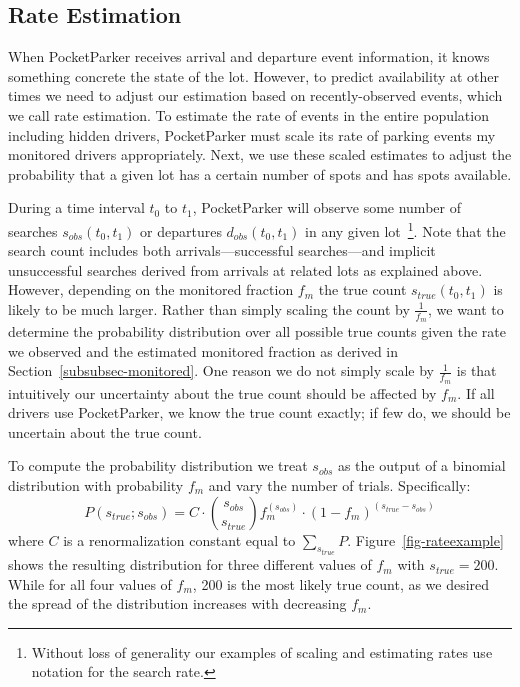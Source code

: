 \subsection{Rate Estimation}
\label{subsec-rates}

When PocketParker receives arrival and departure event information, it knows
something concrete the state of the lot. However, to predict availability at
other times we need to adjust our estimation based on recently-observed
events, which we call rate estimation. To estimate the rate of events in the
entire population including hidden drivers, PocketParker must scale its rate
of parking events my monitored drivers appropriately. Next, we use these
scaled estimates to adjust the probability that a given lot has a certain
number of spots and has spots available.

During a time interval $t_0$ to $t_1$, PocketParker will observe some number
of searches $s_{obs}(t_0, t_1)$ or departures $d_{obs}(t_0, t_1)$ in any
given lot~\footnote{Without loss of generality our examples of scaling and
estimating rates use notation for the search rate.}. Note that the search
count includes both arrivals---successful searches---and implicit
unsuccessful searches derived from arrivals at related lots as explained
above. However, depending on the monitored fraction $f_m$ the true count
$s_{true}(t_0, t_1)$ is likely to be much larger. Rather than simply scaling
the count by $\frac{1}{f_m}$, we want to determine the probability
distribution over all possible true counts given the rate we observed and the
estimated monitored fraction as derived in Section~\ref{subsubsec-monitored}.
One reason we do not simply scale by $\frac{1}{f_m}$ is that intuitively our
uncertainty about the true count should be affected by $f_m$. If all drivers
use PocketParker, we know the true count exactly; if few do, we should be
uncertain about the true count.

To compute the probability distribution we treat $s_{obs}$ as the output of a
binomial distribution with probability $f_m$ and vary the number of trials.
Specifically:
%
\begin{equation} P(s_{true}; s_{obs}) = C \cdot {s_{obs} \choose s_{true}}
f_m^{(s_{obs})} \cdot (1 - f_m)^{(s_{true} - s_{obs})} \end{equation}
%
where $C$ is a renormalization constant equal to $\sum_{s_{true}} P$.
Figure~\ref{fig-rateexample} shows the resulting distribution for three
different values of $f_m$ with $s_{true} = 200$. While for all four values of
$f_m$, 200 is the most likely true count, as we desired the spread of the
distribution increases with decreasing $f_m$.

